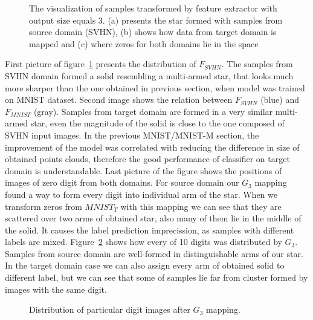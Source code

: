 \documentclass{article}
\begin{document}
\begin{figure}%
    \centering
    \qquad
    \qquad
    \caption{The visualization of samples transformed by feature extractor with output size equals 3. (a) presents the star formed with samples from source domain (SVHN), (b) shows how data from target domain is mapped and (c) where zeros for both domains lie in the space}%
    \label{fig:SVHN_3D}%
\end{figure}
\par
First picture of figure~\ref{fig:SVHN_3D} presents the distribution of $F_{SVHN}$. The samples from SVHN domain formed a solid resembling a multi-armed star, that looks much more sharper than the one obtained in previous section, when model was trained on MNIST dataset. Second image shows the relation between $F_{SVHN}$ (blue) and $F_{MNIST}$ (gray). Samples from target domain are formed in a very similar multi-armed star, even the magnitude of the solid is close to the one composed of SVHN input images. In the previous MNIST/MNIST-M section, the improvement of the model was correlated with reducing the difference in size of obtained points clouds, therefore the good performance of classifier on target domain is understandable. Last picture of the figure shows the positions of images of zero digit from both domains. For source domain our $G_{3}$ mapping found a way to form every digit into individual arm of the star. When we transform zeros from $MNIST_{T}$ with this mapping we can see that they are scattered over two arms of obtained star, also many of them lie in the middle of the solid. It causes the label prediction imprecission, as samples with different labels are mixed. Figure~\ref{fig:SVHN_Digits} shows how every of 10 digits was distributed by $G_{3}$. Samples from source domain are well-formed in distinguishable arms of our star. In the target domain case we can also assign every arm of obtained solid to different label, but we can see that some of samples lie far from cluster formed by images with the same digit.

\begin{figure}[htb]%
    \centering
    \qquad
    \caption{Distribution of particular digit images after $G_{3}$ mapping.}%
    \label{fig:SVHN_Digits}%
\end{figure}
\end{document}
